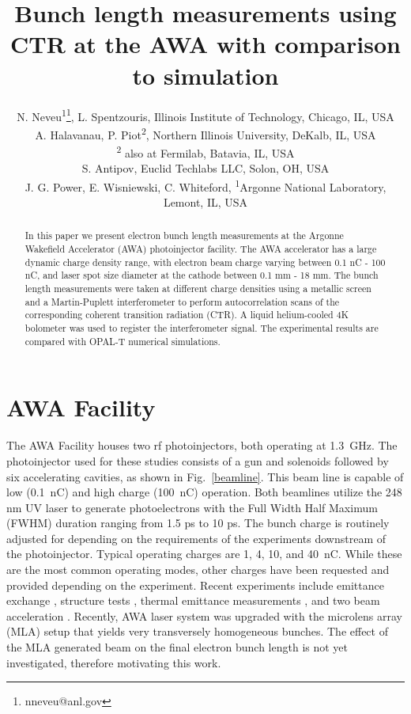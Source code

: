 \documentclass[letterpaper,  %
              ]{jacow-2_3}   %
\begin{document}
\title{Bunch length measurements using CTR at the AWA with comparison to simulation}

\author{N. Neveu\textsuperscript{1}\thanks{nneveu@anl.gov}, 
	    L. Spentzouris, Illinois Institute of Technology, Chicago, IL, USA \\
		A. Halavanau, P. Piot\textsuperscript{2}, Northern Illinois University, DeKalb, IL, USA \\
		\textsuperscript{2} also at Fermilab, Batavia, IL, USA \\
		S. Antipov, Euclid Techlabs LLC, Solon, OH, USA \\
	    J. G. Power, E. Wisniewski, C. Whiteford, \textsuperscript{1}Argonne National  Laboratory, Lemont, IL, USA \\
	    }
\maketitle

%
\begin{abstract}
In this paper we present electron bunch length measurements 
at the Argonne Wakefield Accelerator (AWA) photoinjector facility. 
The AWA accelerator has a large dynamic charge density range, 
with electron beam charge varying between 0.1 nC - 100 nC, 
and laser spot size diameter at the cathode between 0.1 mm - 18 mm. 
The bunch length measurements were taken at different charge densities 
using a metallic screen and a Martin-Puplett interferometer to perform 
autocorrelation scans of the corresponding coherent transition radiation (CTR). 
A liquid helium-cooled 4K bolometer was used to register the interferometer signal. 
The experimental results are compared with OPAL-T numerical simulations.
\end{abstract}


\section{AWA Facility}
The AWA Facility houses two rf photoinjectors, both 
operating at \SI{1.3}{GHz}. The photoinjector used for 
these studies consists of a gun and solenoids followed
by six accelerating cavities, as shown in Fig.~\ref{beamline}. 
This beam line is capable of low (\SI{0.1}{nC}) and 
high charge (\SI{100}{nC}) operation.
Both beamlines utilize the 248 nm UV laser 
to generate photoelectrons with the Full Width Half Maximum
(FWHM) duration ranging from 1.5 ps to 10 ps.
The bunch charge is 
routinely adjusted for depending on the requirements 
of the experiments downstream of the photoinjector.
Typical operating charges are 1, 4, 10, and \SI{40}{nC}. 
While these are the most
common operating modes, other charges have been requested 
and provided depending on the experiment.
Recent experiments include emittance exchange \cite{eex}, 
structure tests \cite{pets}, thermal emittance measurements \cite{therm}, 
and two beam acceleration \cite{tba}. 
Recently, AWA laser system was upgraded with the microlens array (MLA) setup
that yields very transversely homogeneous bunches.
The effect of the MLA generated beam on the final electron 
bunch length is not yet investigated, therefore motivating
this work.
\end{document}

